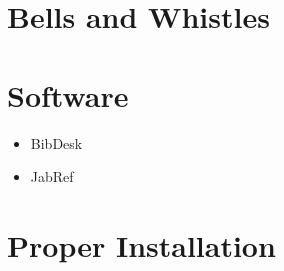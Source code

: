 \documentclass[ number=??
			   ,series=lnls,
			   ,output=long    %
			   ,draftmode  
			  ]{langsci}
\begin{document}
\section{Bells and Whistles}

\section{Software}

\begin{itemize}
\item BibDesk
\item JabRef
\end{itemize}


\section{Proper Installation}



                              
\end{document}
